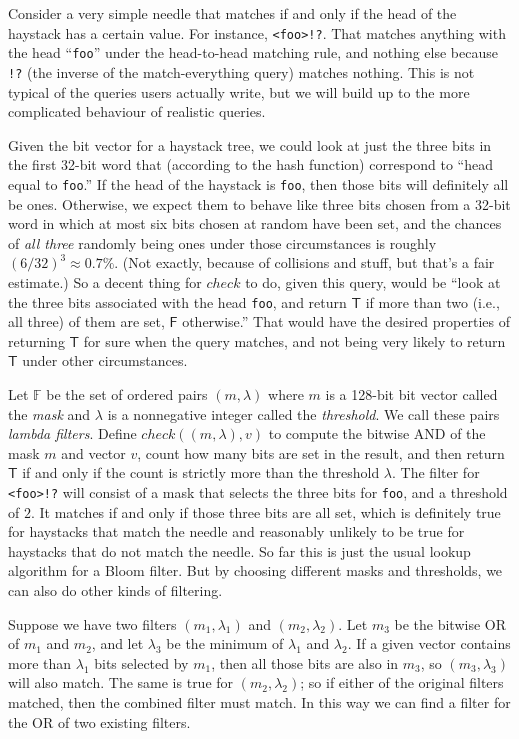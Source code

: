 \documentclass[twocolumn]{report}
\begin{document}
Consider a very simple needle that matches if and only if the
head of the haystack has a certain value.  For instance, \texttt{<foo>!?}. 
That matches anything with the head ``\texttt{foo}'' under the head-to-head
matching rule, and nothing else because \texttt{!?} (the inverse of
the match-everything query) matches nothing.
This is not typical of the queries users actually write, but we will build
up to the more complicated behaviour of realistic queries.

Given the bit vector for a haystack tree, we could look at just the three
bits in the first 32-bit word that (according to the hash function)
correspond to ``head equal to \texttt{foo}.'' If the head of the haystack is
\texttt{foo}, then those bits will definitely all be ones.  Otherwise, we
expect them to behave like three bits chosen from a 32-bit word in
which at most six bits chosen at random have been set, and the chances of
\emph{all three} randomly being ones under those circumstances is roughly
$(6/32)^3\approx 0.7\%$.  (Not exactly, because of collisions and stuff, but
that's a fair estimate.) So a decent thing for $\mathit{check}$ to do, given
this query, would be ``look at the three bits associated with the head
\texttt{foo}, and return $\mathsf{T}$ if more than two (i.e., all three) of
them are set, $\mathsf{F}$ otherwise.'' That would have the desired
properties of returning $\mathsf{T}$ for sure when the query matches, and
not being very likely to return $\mathsf{T}$ under other circumstances.

Let $\mathbb{F}$ be the set of ordered pairs $(m,\lambda)$ where $m$ is a
128-bit bit vector called the \emph{mask} and $\lambda$ is a nonnegative
integer called the \emph{threshold}.  We call these pairs \emph{lambda
filters}.  Define $\mathit{check}((m,\lambda),v)$ to compute the bitwise AND
of the mask $m$ and vector $v$, count how many bits are set in the result,
and then return $\mathsf{T}$ if and only if the count is strictly more than
the threshold $\lambda$.  The filter for \texttt{<foo>!?} will consist of a
mask that selects the three bits for \texttt{foo}, and a threshold of $2$. 
It matches if and only if those three bits are all set, which is definitely
true for haystacks that match the needle and reasonably unlikely to be true
for haystacks that do not match the needle.  So far this is just the usual
lookup algorithm for a Bloom filter.  But by choosing different masks and
thresholds, we can also do other kinds of filtering.

Suppose we have two filters $(m_1,\lambda_1)$ and $(m_2,\lambda_2)$.  Let
$m_3$ be the bitwise OR of $m_1$ and $m_2$, and let $\lambda_3$ be the
minimum of $\lambda_1$ and $\lambda_2$.  If a given vector contains more
than $\lambda_1$ bits selected by $m_1$, then all those bits are also in
$m_3$, so $(m_3,\lambda_3)$ will also match.  The same is true for
$(m_2,\lambda_2)$; so if either of the original filters matched, then the
combined filter must match.  In this way we can find a filter for the OR of
two existing filters.
\end{document}
